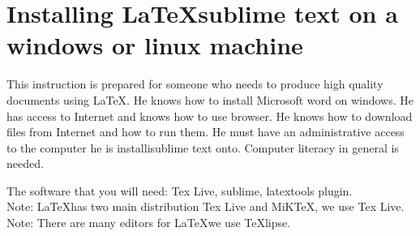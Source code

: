 \documentclass{memoir}
\begin{document}
 

 
\section*{Installing \LaTeX sublime text on a windows or linux machine}
This instruction is prepared for someone who needs to produce high quality documents using \LaTeX.
He knows how to install Microsoft word on windows. 
He has access to Internet and knows how to use browser. 
He knows how to download files from Internet and how to run them.
He must have an administrative access to the computer he is installisublime text onto.
Computer literacy in general is needed. 
  
The software that you will need: Tex Live, sublime, latextools plugin. \\
Note: \LaTeX has two main distribution Tex Live and MiKTeX, we use Tex Live.  \\ 
Note: There are many editors for \LaTeX we use TeXlipse.  
\end{document}
